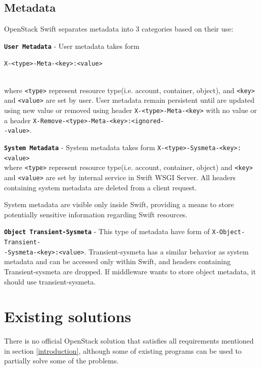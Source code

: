 \documentclass{ExcelAtFIT}
\begin{document}
\subsection{Metadata}
OpenStack Swift separates metadata into 3 categories based on their use:

\textbf{\texttt{User Metadata}} - User metadata takes form \\
\centerline{\texttt{X-<type>-Meta-<key>:<value>}}\\ where \texttt{<type>} represent resource type(i.e. account, container, object), and \texttt{<key>} and \texttt{<value>} are set by user. User metadata remain persistent until are updated using new value or removed using header \texttt{X-<type>-Meta-<key>} with no value or a header \texttt{X-Remove-<type>-Meta-<key>:<ignored-\\-value>}.

\textbf{\texttt{System Metadata}} - System metadata takes form \texttt{X-<type>-Sysmeta-<key>:<value>}\\ where \texttt{<type>} represent resource type(i.e. account, container, object) and \texttt{<key>} and \texttt{<value>} are set by internal service in Swift WSGI Server.
		All headers containing system metadata are deleted from a client request.

		System metadata are visible only inside Swift, providing a means to store potentially sensitive information regarding Swift resources.

\textbf{\texttt{Object Transient-Sysmeta}} - This type of metadata have form of \texttt{X-Object-Transient-\\-Sysmeta-<key>:<value>}. Transient-sysmeta has a similar behavior as system metadata and can be accessed only within Swift, and headers containing Transient-sysmeta are dropped. If middleware wants to store object metadata, it should use transient-sysmeta\cite{swiftMiddleware}.


\section{Existing solutions}
There is no official OpenStack solution that satisfies all requirements mentioned in section \ref{introduction}, although some of existing programs can be used to partially solve some of the problems.
\end{document}
